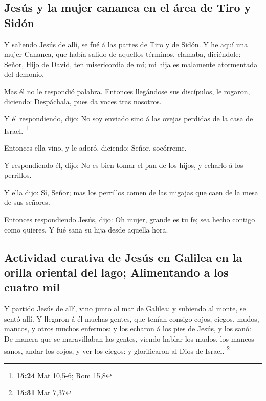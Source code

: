 \hypertarget{jesuxfas-y-la-mujer-cananea-en-el-uxe1rea-de-tiro-y-siduxf3n}{%
\subsection{Jesús y la mujer cananea en el área de Tiro y
Sidón}\label{jesuxfas-y-la-mujer-cananea-en-el-uxe1rea-de-tiro-y-siduxf3n}}

 Y saliendo Jesús de allí, se fué á las partes de Tiro y de
Sidón.  Y he aquí una mujer Cananea, que había salido de
aquellos términos, clamaba, diciéndole: Señor, Hijo de David, ten
misericordia de mí; mi hija es malamente atormentada del demonio.

 Mas él no le respondió palabra. Entonces llegándose sus
discípulos, le rogaron, diciendo: Despáchala, pues da voces tras
nosotros.

 Y él respondiendo, dijo: No soy enviado sino á las ovejas
perdidas de la casa de Israel. \footnote{\textbf{15:24} Mat 10,5-6; Rom
  15,8}

 Entonces ella vino, y le adoró, diciendo: Señor,
socórreme.

 Y respondiendo él, dijo: No es bien tomar el pan de los
hijos, y echarlo á los perrillos.

 Y ella dijo: Sí, Señor; mas los perrillos comen de las
migajas que caen de la mesa de sus señores.

 Entonces respondiendo Jesús, dijo: Oh mujer, grande es tu
fe; sea hecho contigo como quieres. Y fué sana su hija desde aquella
hora.

\hypertarget{actividad-curativa-de-jesuxfas-en-galilea-en-la-orilla-oriental-del-lago-alimentando-a-los-cuatro-mil}{%
\subsection{Actividad curativa de Jesús en Galilea en la orilla oriental
del lago; Alimentando a los cuatro
mil}\label{actividad-curativa-de-jesuxfas-en-galilea-en-la-orilla-oriental-del-lago-alimentando-a-los-cuatro-mil}}

 Y partido Jesús de allí, vino junto al mar de Galilea: y
subiendo al monte, se sentó allí.  Y llegaron á él muchas
gentes, que tenían consigo cojos, ciegos, mudos, mancos, y otros muchos
enfermos: y los echaron á los pies de Jesús, y los sanó: 
De manera que se maravillaban las gentes, viendo hablar los mudos, los
mancos sanos, andar los cojos, y ver los ciegos: y glorificaron al Dios
de Israel. \footnote{\textbf{15:31} Mar 7,37}


